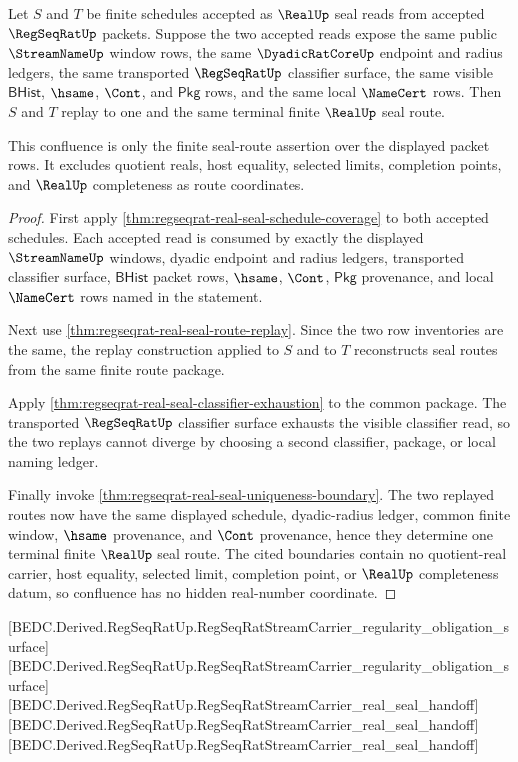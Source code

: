 \begin{theorem}
\label{thm:regseqrat-real-seal-schedule-confluence}
Let $S$ and $T$ be finite schedules accepted as $\RealUp$ seal reads from
accepted $\RegSeqRatUp$ packets. Suppose the two accepted reads expose the
same public $\StreamNameUp$ window rows, the same $\DyadicRatCoreUp$ endpoint
and radius ledgers, the same transported $\RegSeqRatUp$ classifier surface,
the same visible $\mathsf{BHist}$, $\hsame$, $\Cont$, and $\mathsf{Pkg}$ rows,
and the same local $\NameCert$ rows. Then $S$ and $T$ replay to one and the
same terminal finite $\RealUp$ seal route.

This confluence is only the finite seal-route assertion over the displayed
packet rows. It excludes quotient reals, host equality, selected limits,
completion points, and $\RealUp$ completeness as route coordinates.
\end{theorem}
\begin{proof}
First apply
\autoref{thm:regseqrat-real-seal-schedule-coverage} to both accepted
schedules. Each accepted read is consumed by exactly the displayed
$\StreamNameUp$ windows, dyadic endpoint and radius ledgers, transported
classifier surface, $\mathsf{BHist}$ packet rows, $\hsame$, $\Cont$,
$\mathsf{Pkg}$ provenance, and local $\NameCert$ rows named in the statement.

Next use \autoref{thm:regseqrat-real-seal-route-replay}. Since the two row
inventories are the same, the replay construction applied to $S$ and to $T$
reconstructs seal routes from the same finite route package.

Apply \autoref{thm:regseqrat-real-seal-classifier-exhaustion} to the common
package. The transported $\RegSeqRatUp$ classifier surface exhausts the
visible classifier read, so the two replays cannot diverge by choosing a
second classifier, package, or local naming ledger.

Finally invoke \autoref{thm:regseqrat-real-seal-uniqueness-boundary}. The two
replayed routes now have the same displayed schedule, dyadic-radius ledger,
common finite window, $\hsame$ provenance, and $\Cont$ provenance, hence they
determine one terminal finite $\RealUp$ seal route. The cited boundaries
contain no quotient-real carrier, host equality, selected limit, completion
point, or $\RealUp$ completeness datum, so confluence has no hidden
real-number coordinate.
\end{proof}

[BEDC.Derived.RegSeqRatUp.RegSeqRatStreamCarrier\_regularity\_obligation\_surface]
[BEDC.Derived.RegSeqRatUp.RegSeqRatStreamCarrier\_regularity\_obligation\_surface]
[BEDC.Derived.RegSeqRatUp.RegSeqRatStreamCarrier\_real\_seal\_handoff]
[BEDC.Derived.RegSeqRatUp.RegSeqRatStreamCarrier\_real\_seal\_handoff]
[BEDC.Derived.RegSeqRatUp.RegSeqRatStreamCarrier\_real\_seal\_handoff]


